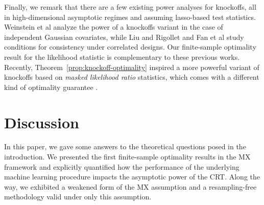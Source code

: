 \documentclass[12pt]{article}
\theoremstyle{definition}
\theoremstyle{remark}
\newcommand{\srx}{X}
\newcommand{\srz}{Z}
\newcommand{\srxk}{\widetilde X}
\newcommand{\sry}{Y}
\begin{document}
Finally, we remark that there are a few existing power analyses for knockoffs, all in high-dimensional asymptotic regimes and assuming lasso-based test statistics. Weinstein et al \cite{Weinstein2017} analyze the power of a knockoffs variant in the case of independent Gaussian covariates, while Liu and Rigollet \cite{Liu2019} and Fan et al \cite{Fan2020} study conditions for consistency under correlated designs. Our finite-sample optimality result for the likelihood statistic is complementary to these previous works. Recently, Theorem~\ref{prop:knockoff-optimality} inspired a more powerful variant of knockoffs based on \textit{masked likelihood ratio} statistics, which comes with a different kind of optimality guarantee \cite{Spector2022}.




\section{Discussion}
\label{sec:discussion}

In this paper, we gave some answers to the theoretical questions posed in the introduction. We presented the first finite-sample optimality results in the MX framework and explicitly quantified how the performance of the underlying machine learning procedure impacts the asymptotic power of the CRT. Along the way, we exhibited a weakened form of the MX assumption and a resampling-free methodology valid under only this assumption.
\end{document}

